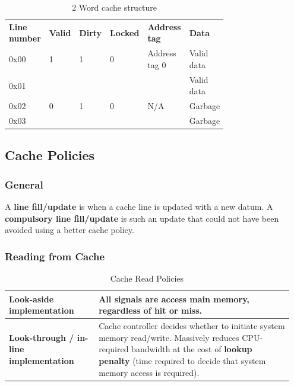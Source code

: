 			\begin{table}[H]
				\centering
				\begin{tabular}{p{0.15\linewidth}|p{0.06\linewidth}|p{0.06\linewidth}|p{0.06\linewidth}|p{0.2\linewidth}|p{0.2\linewidth}|}
					\cline{2-6}
						\textbf{Line number}
							& \textbf{Valid}
							& \textbf{Dirty}
							& \textbf{Locked}
							& \textbf{Address tag}
							& \textbf{Data}\\
					\cline{2-6}
						0x00
							& 1
							& 1
							& 0
							& Address tag 0
							& Valid data\\
					\cline{2-6}
						0x01
							& 
							& 
							& 
							& 
							& Valid data\\
					\cline{2-6}
						0x02
							& 0
							& 1
							& 0
							& N/A
							& Garbage\\
					\cline{2-6}
						0x03
							& 
							& 
							& 
							& 
							& Garbage\\
					\cline{2-6}
				\end{tabular}
				\caption{2 Word cache structure}
			\end{table}	

	\subsection{Cache Policies}
		\subsubsection{General}
			A \textbf{line fill/update} is when a cache line is updated with a new datum. A \textbf{compulsory line fill/update} is such an update that could not have been avoided using a better cache policy.
			
		\subsubsection{Reading from Cache}
			\begin{table}[H]
				\centering
				\begin{tabular}{|>{\bfseries}p{0.3\linewidth}|p{0.65\linewidth}|}
					\hline
					Look-aside implementation
						& All signals are access main memory, regardless of hit or miss.\\
					\hline
					Look-through / in-line implementation
						& Cache controller decides whether to initiate system memory read/write. Massively reduces CPU-required bandwidth at the cost of \textbf{lookup penalty} (time required to decide that system memory access is required). \\
					\hline
				\end{tabular}
				\caption{Cache Read Policies}
			\end{table}
			
